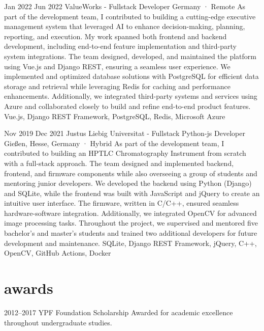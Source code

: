 \documentclass[a4paper,nocolors]{cv-friggeri-x}
\begin{document}
\begin{entrylist}
\entryexperience
{Jan 2022}
{Jun 2022}
{ValueWorks - Fullstack Developer}
{Germany · Remote}
{As part of the development team, I contributed to building a cutting-edge executive management system that leveraged AI to enhance decision-making, planning, reporting, and execution. My work spanned both frontend and backend development, including end-to-end feature implementation and third-party system integrations. The team designed, developed, and maintained the platform using Vue.js and Django REST, ensuring a seamless user experience. We implemented and optimized database solutions with PostgreSQL for efficient data storage and retrieval while leveraging Redis for caching and performance enhancements. Additionally, we integrated third-party systems and services using Azure and collaborated closely to build and refine end-to-end product features.}
{Vue.js, Django REST Framework, PostgreSQL, Redis, Microsoft Azure}

\entryexperience
{Nov 2019}
{Dec 2021}
{Justus Liebig Universitat - Fullstack Python-js Developer}
{Gießen, Hesse, Germany · Hybrid}
{As part of the development team, I contributed to building an HPTLC Chromatography Instrument from scratch with a full-stack approach. The team designed and implemented backend, frontend, and firmware components while also overseeing a group of students and mentoring junior developers. We developed the backend using Python (Django) and SQLite, while the frontend was built with JavaScript and jQuery to create an intuitive user interface. The firmware, written in C/C++, ensured seamless hardware-software integration. Additionally, we integrated OpenCV for advanced image processing tasks. Throughout the project, we supervised and mentored five bachelor’s and master’s students and trained two additional developers for future development and maintenance.}
{SQLite, Django REST Framework, jQuery, C++, OpenCV, GitHub Actions, Docker}

\end{entrylist}


\section{awards}

\begin{entrylist}


\entry
{2012–2017}
{YPF Foundation Scholarship}
{Awarded for academic excellence throughout undergraduate studies.}

\end{entrylist}
\end{document}
